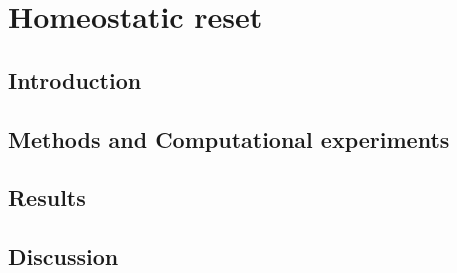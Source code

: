 \chapter{Homeostatic reset}
\section{Introduction}
\section{Methods and Computational experiments}
\section{Results}
\section{Discussion}